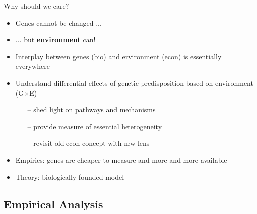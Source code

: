 \documentclass[10pt,compress,xcolor=dvipsnames]{beamer}    %
\newcounter{ex}
\newcommand{\1}[1]{\mathrm{1\hspace*{-2.5pt}l}[#1]}	%
\begin{document}
\begin{frame}{Why should we care?}\label{frame:why}

\begin{itemize}
\item Genes cannot be changed ...
\item ... but \textbf{environment} can!
\item Interplay between genes (bio) and environment (econ) is essentially everywhere \cite{Rutter2006}

\vspace{3ex}

\item Understand differential effects of genetic predisposition based on environment (G$\times$E)
\begin{enumerate}
	\item[--] shed light on pathways and mechanisms
	\item[--] provide measure of essential heterogeneity
	\item[--] revisit old econ concept with new lens
\end{enumerate}

\vspace{3ex}

\item Empirics: genes are cheaper to measure and more and more available  \hyperlink{frame:dollargenome}{\beamergotobutton{}}
\item Theory: biologically founded model

\end{itemize}
\end{frame}

\subsection{Empirical Analysis}
\end{document}
